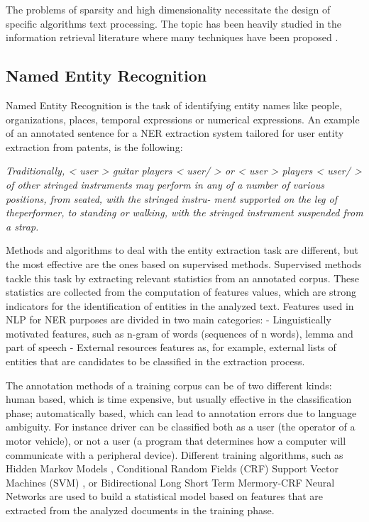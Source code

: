 \documentclass[]{book}
\begin{document}
The problems of sparsity and high dimensionality necessitate the design
of specific algorithms text processing. The topic has been heavily
studied in the information retrieval literature where many techniques
have been proposed \citep{ricardo2011modern}.

\subsection{Named Entity Recognition}\label{sotatoolsmodelner}

Named Entity Recognition is the task of identifying entity names like
people, organizations, places, temporal expressions or numerical
expressions. An example of an annotated sentence for a NER extraction
system tailored for user entity extraction from patents, is the
following:

\emph{Traditionally, \textless{} user \textgreater{} guitar players
\textless{} user/ \textgreater{} or \textless{} user \textgreater{}
players \textless{} user/ \textgreater{} of other stringed instruments
may perform in any of a number of various positions, from seated, with
the stringed instru- ment supported on the leg of theperformer, to
standing or walking, with the stringed instrument suspended from a
strap.}

Methods and algorithms to deal with the entity extraction task are
different, but the most effective are the ones based on supervised
methods. Supervised methods tackle this task by extracting relevant
statistics from an annotated corpus. These statistics are collected from
the computation of features values, which are strong indicators for the
identification of entities in the analyzed text. Features used in NLP
for NER purposes are divided in two main categories: - Linguistically
motivated features, such as n-gram of words (sequences of n words),
lemma and part of speech - External resources features as, for example,
external lists of entities that are candidates to be classified in the
extraction process.

The annotation methods of a training corpus can be of two different
kinds: human based, which is time expensive, but usually effective in
the classification phase; automatically based, which can lead to
annotation errors due to language ambiguity. For instance driver can be
classified both as a user (the operator of a motor vehicle), or not a
user (a program that determines how a computer will communicate with a
peripheral device). Different training algorithms, such as Hidden Markov
Models \citep{eddy1996hidden}, Conditional Random Fields (CRF)
\citep{lafferty2001conditional} Support Vector Machines (SVM)
\citep{hearst1998support}, or Bidirectional Long Short Term Mermory-CRF
Neural Networks \citep[\citet{misawa2017character}]{lample2016neural}
are used to build a statistical model based on features that are
extracted from the analyzed documents in the training phase.
\end{document}

